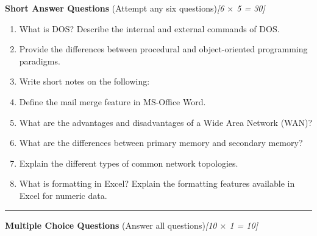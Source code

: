 \documentclass[11pt,a4paper]{article}
\newcommand{\pts}[1]{\hfill   \textit{[#1]}}
\begin{document}
\noindent   \textbf{Short Answer Questions} (Attempt any six questions)\pts{6 $ \times$ 5 = 30}

\begin{enumerate}[label=\alph*.,leftmargin=*,itemsep=8pt]
  \item What is DOS? Describe the internal and external commands of DOS.
  \item Provide the differences between procedural and object-oriented programming paradigms.
  \item Write short notes on the following:
  
  \item Define the mail merge feature in MS-Office Word.
  \item What are the advantages and disadvantages of a Wide Area Network (WAN)?
  \item What are the differences between primary memory and secondary memory?
  \item Explain the different types of common network topologies.
  \item What is formatting in Excel? Explain the formatting features available in Excel for numeric data.
\end{enumerate}

\bigskip



\rule{\linewidth}{0.4pt}\smallskip




\noindent   \textbf{Multiple Choice Questions} (Answer all questions)\pts{10 $ \times$ 1 = 10}
\end{document}
